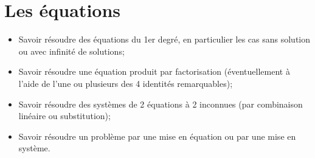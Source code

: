 \chapter{Les équations}\label{ChLesEquations}

\begin{acquis}
\begin{itemize}
\item Savoir résoudre des équations du 1er degré, en particulier les cas sans solution ou avec infinité de solutions;
\item Savoir résoudre une équation produit par factorisation (éventuellement à l’aide de l’une ou plusieurs des 4 identités remarquables);
\item Savoir résoudre des systèmes de 2 équations à 2 inconnues (par combinaison linéaire ou substitution);
\item Savoir résoudre un problème par une mise en équation ou par une mise en système.
\end{itemize}
\end{acquis}

\exercicesbase
\begin{colonne*exercice}

\end{colonne*exercice}




\connaissances
%



\pagebreak


%


